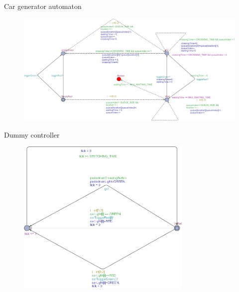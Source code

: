 \documentclass{bredelebeamer}
\begin{document}
\begin{frame}{Car generator automaton}
\begin{figure}[h]
\centering
\includegraphics[width=\textwidth]{images/cargeneratort.png}
\end{figure}
\end{frame}

\begin{frame}{Dummy controller}
\begin{figure}[h]
\centering
\includegraphics[width=0.75\textwidth]{images/controller.png}
\end{figure}
\end{frame}
\end{document}
